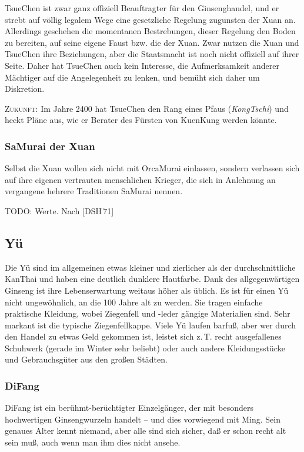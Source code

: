 \documentclass[
a4paper,
twoside,
DIV=calc,
BCOR=4mm,
fontsize=9pt,
twocolumn=on,
titlepage=on,
parskip=half
]{scrartcl}
\begin{document}
TsueChen ist zwar ganz offiziell Beauftragter für den Ginsenghandel,
und er strebt auf völlig legalem Wege eine gesetzliche Regelung
zugunsten der Xuan an. Allerdings geschehen die momentanen Bestrebungen, dieser
Regelung den Boden zu bereiten, auf seine eigene Faust bzw. die der
Xuan. Zwar nutzen die Xuan und TsueChen ihre Beziehungen, aber die
Staatsmacht ist noch nicht offiziell auf ihrer Seite. Daher hat
TsueChen auch kein Interesse, die Aufmerksamkeit anderer Mächtiger auf die
Angelegenheit zu lenken, und bemüht sich daher um Diskretion.

\textsc{Zukunft:} Im Jahre 2400 hat TsueChen den Rang eines Pfaus
(\emph{KongTschi}) und heckt Pläne aus, wie er Berater des Fürsten von
KuenKung werden könnte.

\subsubsection{SaMurai der Xuan}

Selbst die Xuan wollen sich nicht mit OrcaMurai einlassen, sondern
verlassen sich auf ihre eigenen vertrauten menschlichen Krieger, die
sich in Anlehnung an vergangene hehrere Traditionen SaMurai nennen.

TODO: Werte. Nach [DSH\,71]

\subsection{Yü}

Die Yü sind im allgemeinen etwas kleiner und zierlicher als der
durchschnittliche KanThai und haben eine deutlich dunklere
Hautfarbe. Dank des allgegenwärtigen Ginseng ist ihre Lebenserwartung
weitaus höher als üblich. Es ist für einen Yü nicht ungewöhnlich, an die
100 Jahre alt zu werden. Sie tragen einfache praktische Kleidung,
wobei Ziegenfell und -leder gängige Materialien sind. Sehr markant ist
die typische Ziegenfellkappe. Viele Yü laufen barfuß, aber wer durch
den Handel zu etwas Geld gekommen ist, leistet sich z.\,T. recht
ausgefallenes Schuhwerk (gerade im Winter sehr beliebt) oder auch
andere Kleidungsstücke und Gebrauchsgüter aus den großen Städten.

\subsubsection{DiFang}

DiFang ist ein berühmt-berüchtigter Einzelgänger, der mit besonders
hochwertigen Ginsengwurzeln handelt -- und dies vorwiegend mit
Ming. Sein genaues Alter kennt niemand, aber alle sind sich sicher,
daß er schon recht alt sein muß, auch wenn man ihm dies nicht ansehe.
\end{document}
